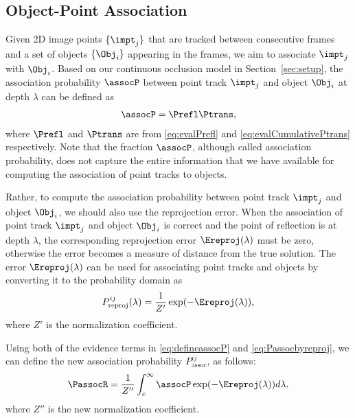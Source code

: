 \subsection{Object-Point Association}
\label{sec:association}


Given 2D image points $\{\impt_j\}$ that are tracked between consecutive frames and a set of objects $\{\Obj_i\}$ appearing in the frames, we aim to associate $\impt_j$ with $\Obj_i$. Based on our continuous occlusion model in Section~\ref{sec:setup}, the association probability $\assocP$ between point track $\impt_j$ and object $\Obj_i$ at depth $\lambda$ can be defined as
\begin{align}
\assocP = \Prefl\Ptrans,
\label{eq:defineassocP}
\end{align}
where $\Prefl$ and $\Ptrans$ are from \eqref{eq:evalPrefl} and \eqref{eq:evalCumulativePtrans} respectively. Note that the fraction $\assocP$, although called association probability, does not capture the entire information that we have available for computing the association of point tracks to objects. 

Rather, to compute the association probability between point track $\impt_j$ and object $\Obj_i$, we should also use the reprojection error. When the association of point track $\impt_j$ and object $\Obj_i$ is correct and the point of reflection is at depth $\lambda$, the corresponding reprojection error $\Ereproj(\lambda)$ must be zero, otherwise the error becomes a measure of distance from the true solution. The error $\Ereproj(\lambda)$ can be used for associating point tracks and objects by converting it to the probability domain as
\begin{align}
  P^{ij}_{\text{reproj}}(\lambda) = \frac{1}{Z'}\exp(-\Ereproj(\lambda)),
\label{eq:Passocbyreproj}
\end{align}
where $Z'$ is the normalization coefficient.

Using both of the evidence terms in \eqref{eq:defineassocP} and \eqref{eq:Passocbyreproj}, we can define the new association probability $P^{ij}_{\text{assoc}}$, as follows:
\begin{align}
  \PassocR = \frac{1}{Z''}\int_c^{\infty} \assocP \exp(-\Ereproj(\lambda))d\lambda,
  \label{eq:prob-assoc}
\end{align}
where $Z''$ is the new normalization coefficient.
 
